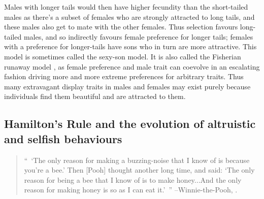 Males with longer tails would then have higher fecundity than
the short-tailed males as there's a subset of females who are strongly
attracted to long tails, and these males also get to mate with the
other females. Thus selection favours long-tailed males, and so indirectly favours
female preference for longer tails; females with a preference
for longer-tails have sons who in turn are more attractive. This
model is sometimes called the sexy-son model. It is also called
the Fisherian runaway model \citep{fisher1915evolution}, as female
preference and male trait can coevolve in an escalating fashion
driving more and more extreme preferences for arbitrary traits. Thus
many extravagant display traits in males and females may exist purely
because individuals find them beautiful and are attracted to them. 







\subsection{Hamilton's Rule and the evolution of altruistic and
  selfish behaviours}
\begin{quotation}
``~`The only reason for making a buzzing-noise that I know of is
because you're a bee.' Then [Pooh] thought another long time, and
said: `The only reason for being a bee that I know of is to make
honey...And the only reason for making honey is so as I can eat it.'~''
--Winnie-the-Pooh, \citet{milne}.  
\end{quotation}


